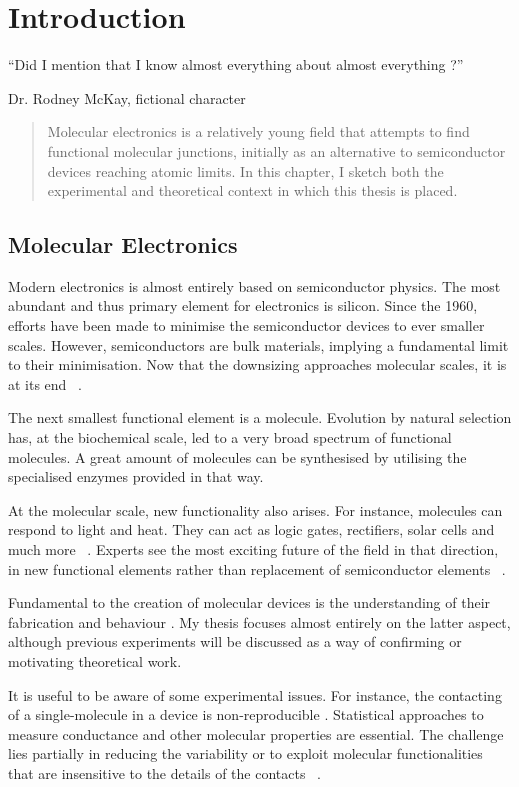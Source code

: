 \chapter{Introduction}
\label{ch:chapter_1}
 
\epigraph{
    “Did I mention that I know almost everything about almost everything ?”
}{Dr. Rodney McKay, fictional character}

\begin{abstract}
Molecular electronics is a relatively young field that attempts to find functional molecular junctions, initially as an alternative to semiconductor devices reaching atomic limits. In this chapter, I sketch both the experimental and theoretical context in which this thesis is placed.
\end{abstract}

\newpage
\section{Molecular Electronics}
Modern electronics is almost entirely based on semiconductor physics. The most abundant and thus primary element for electronics is silicon. Since the 1960, efforts have been made to minimise the semiconductor devices to ever smaller scales. However, semiconductors are bulk materials, implying a fundamental limit to their minimisation. Now that the downsizing approaches molecular scales, it is at its end ~\cite{seldenthuis}.

The next smallest functional element is a molecule. Evolution by natural selection has, at the biochemical scale, led to a very broad spectrum of functional molecules. A great amount of molecules can be synthesised by utilising the specialised enzymes provided in that way.

At the molecular scale, new functionality also arises. For instance, molecules can respond to light and heat. They can act as logic gates, rectifiers, solar cells and much more ~\cite{perrin}. Experts see the most exciting future of the field in that direction, in new functional elements rather than replacement of semiconductor elements ~\cite{visions}.

Fundamental to the creation of molecular devices is the understanding of their fabrication and behaviour . My thesis focuses almost entirely on the latter aspect, although previous experiments will be discussed as a way of confirming or motivating theoretical work.

It is useful to be aware of some experimental issues. For instance, the contacting of a single-molecule in a device is non-reproducible . Statistical approaches to measure conductance and other molecular properties are essential. The challenge lies partially in reducing the variability or to exploit molecular functionalities that are insensitive to the details of the contacts ~\cite{visions}.


